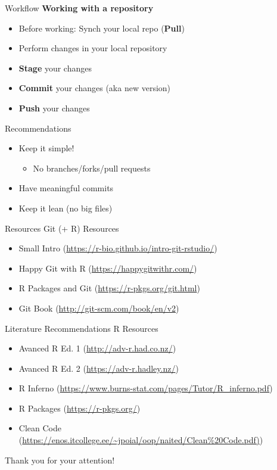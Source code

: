 \documentclass[xcolor=table]{beamer}\usepackage[]{graphicx}\usepackage[]{color}
\begin{document}
\begin{frame}{Workflow}
\textbf{Working with a repository}
\begin{itemize}
  \item Before working: Synch your local repo (\textbf{Pull})
  \item Perform changes in your local repository
  \item \textbf{Stage} your changes
  \item \textbf{Commit} your changes (aka new version)
  \item \textbf{Push} your changes
\end{itemize}
\end{frame}

\begin{frame}{Recommendations}
\begin{itemize}
  \item Keep it simple! 
  \begin{itemize}
    \item No branches/forks/pull requests
  \end{itemize}
  \item Have meaningful commits
  \item Keep it lean (no big files)
\end{itemize}
\end{frame}

\begin{frame}{Resources}
Git (+ R) Resources
\begin{itemize}
\item Small Intro (\url{https://r-bio.github.io/intro-git-rstudio/})
\item Happy Git with R (\url{https://happygitwithr.com/})
\item R Packages and Git (\url{https://r-pkgs.org/git.html})
\item Git Book (\url{http://git-scm.com/book/en/v2})
\end{itemize}

\end{frame}

\begin{frame}{Literature Recommendations}
R Resources
\begin{itemize}
\item Avanced R Ed. 1 (\url{http://adv-r.had.co.nz/})
\item Avanced R Ed. 2 (\url{https://adv-r.hadley.nz/})
\item R Inferno (\url{https://www.burns-stat.com/pages/Tutor/R_inferno.pdf})
\item R Packages (\url{https://r-pkgs.org/})
\item Clean Code (\url{https://enos.itcollege.ee/~jpoial/oop/naited/Clean\%20Code.pdf)})
\end{itemize}

\end{frame}

\begin{frame}[plain]

\begin{center}
\Large Thank you for your attention!

\end{center}

\end{frame}
\end{document}
